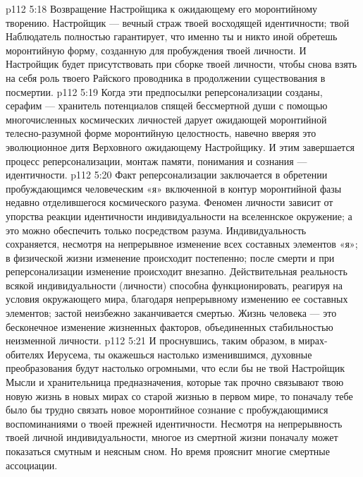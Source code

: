 \vs p112 5:18 \bibnobreakspace Возвращение Настройщика к ожидающему его моронтийному творению. Настройщик --- вечный страж твоей восходящей идентичности; твой Наблюдатель полностью гарантирует, что именно ты и никто иной обретешь моронтийную форму, созданную для пробуждения твоей личности. И Настройщик будет присутствовать при сборке твоей личности, чтобы снова взять на себя роль твоего Райского проводника в продолжении существования в посмертии.
\vs p112 5:19 \bibnobreakspace Когда эти предпосылки реперсонализации созданы, серафим --- хранитель потенциалов спящей бессмертной души с помощью многочисленных космических личностей дарует ожидающей моронтийной телесно\hyp{}разумной форме моронтийную целостность, навечно вверяя это эволюционное дитя Верховного ожидающему Настройщику. И этим завершается процесс реперсонализации, монтаж памяти, понимания и сознания --- идентичности.
\vs p112 5:20 \pc Факт реперсонализации заключается в обретении пробуждающимся человеческим «я» включенной в контур моронтийной фазы недавно отделившегося космического разума. Феномен личности зависит от упорства реакции идентичности индивидуальности на вселеннское окружение; а это можно обеспечить только посредством разума. Индивидуальность сохраняется, несмотря на непрерывное изменение всех составных элементов «я»; в физической жизни изменение происходит постепенно; после смерти и при реперсонализации изменение происходит внезапно. Действительная реальность всякой индивидуальности (личности) способна функционировать, реагируя на условия окружающего мира, благодаря непрерывному изменению ее составных элементов; застой неизбежно заканчивается смертью. Жизнь человека --- это бесконечное изменение жизненных факторов, объединенных стабильностью неизменной личности.
\vs p112 5:21 И проснувшись, таким образом, в мирах\hyp{}обителях Иерусема, ты окажешься настолько изменившимся, духовные преобразования будут настолько огромными, что если бы не твой Настройщик Мысли и хранительница предназначения, которые так прочно связывают твою новую жизнь в новых мирах со старой жизнью в первом мире, то поначалу тебе было бы трудно связать новое моронтийное сознание с пробуждающимися воспоминаниями о твоей прежней идентичности. Несмотря на непрерывность твоей личной индивидуальности, многое из смертной жизни поначалу может показаться смутным и неясным сном. Но время прояснит многие смертные ассоциации.
